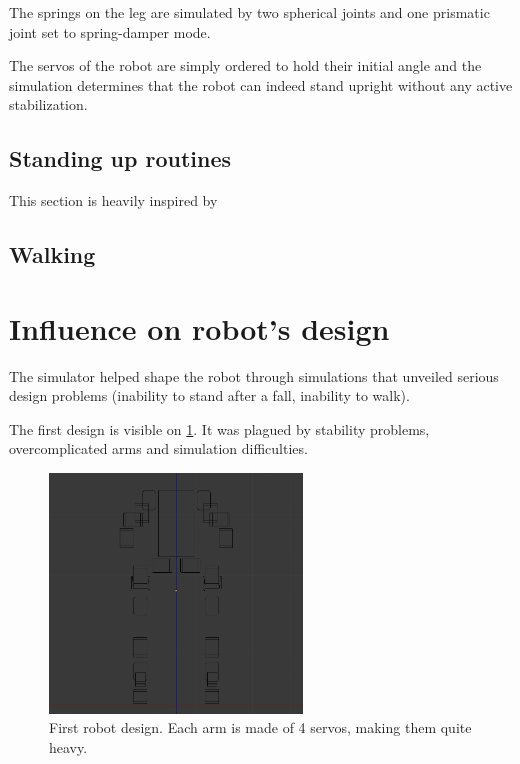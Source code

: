 The springs on the leg are simulated by two spherical joints and one prismatic joint set to spring-damper mode.

The servos of the robot are simply ordered to hold their initial angle and the simulation determines that the robot can indeed stand upright without any active stabilization.

\subsection{Standing up routines}
This section is heavily inspired by \cite{Stuckler06}

\subsection{Walking}

\section{Influence on robot's design}
The simulator helped shape the robot through simulations that unveiled serious design problems (inability to stand after a fall, inability to walk).

The first design is visible on \cref{fig:first_robot}. It was plagued by stability problems, overcomplicated arms and simulation difficulties. 
\begin{figure}[htp]
\center
\includegraphics[width=0.6\textwidth]{figures/robot1}
\caption[Initial robot design]{First robot design. Each arm is made of 4 servos, making them quite heavy.}
\label{fig:first_robot}
\end{figure}

